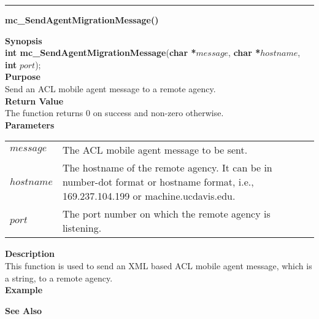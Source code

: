 \noindent
\vspace{5pt}
\rule{6.5in}{.01in}
\noindent
{\LARGE \bf mc\_SendAgentMigrationMessage()}\\
{}

\noindent
{\bf Synopsis}\\
{\bf int mc\_SendAgentMigrationMessage}({\bf char *}$message$, {\bf char *}$hostname$, {\bf int} $port$);\\

\noindent
{\bf Purpose}\\
Send an ACL mobile agent message to a remote agency.\\

\noindent
{\bf Return Value}\\
The function returns 0 on success and non-zero otherwise.\\

\noindent
{\bf Parameters}
\vspace{-0.1in}
\begin{description}
\item
\begin{tabular}{p{20 mm}p{135 mm}}
$message$ & The ACL mobile agent message to be sent.\\
$hostname$ & The hostname of the remote agency. It can be in number-dot 
format or hostname format, i.e., 169.237.104.199 or machine.ucdavis.edu.\\
$port$ & The port number on which the remote agency is listening. 
\end{tabular}
\end{description}

\noindent
{\bf Description}\\
This function is used to send an XML based ACL mobile agent message, which 
is a string, to a remote agency.\\ 

\noindent
{\bf Example}\\
\noindent

\noindent
{\bf See Also}\\

